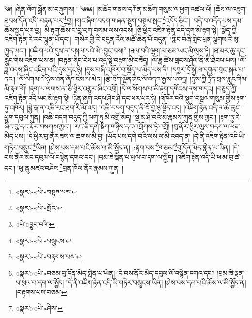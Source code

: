 ༄། །ཞེན་ལོག་སྒྲོན་མ་བཞུགས། ། ༄༅༅། །མཆོད་གནས་དཀོན་མཆོག་གསུམ་ལ་ཕྱག་འཚལ་ལོ། །ཆོས་ལ་འཇུག་ཐབས་དོན་འདི་:བརྟན་པར་\footnote{«སྣར་»«པེ་»བསྟན་པར་}བྱ། །གང་ཞིག་བདག་གཞན་སྡུག་བསྔལ་སྤང་\footnote{«སྣར་»«པེ་»སྤོང་}འདོད་ཅིང་། །བདེ་བ་འདོད་པས་དམ་ཆོས་སྤྱད་པར་བྱ། །མི་རྟག་ཆོས་ལ་བྱེ་བྲག་བསམ་ལས་འདས། །ཅི་ཕྱིར་འཇིག་རྟེན་འདི་དག་མི་རྟག་སྟེ། །སྣོད་ཀྱི་འཇིག་རྟེན་རི་རབ་ལྷུན་པོ་དང་། །གསེར་གྱི་རི་བདུན་རོལ་མཚོ་ཆེན་པོ་བདུན། །གླིང་བཞི་གླིང་ཕྲན་ལྕགས་རི་མུ་ཁྱུད་ཡང་། །འཇིག་པའི་དུས་ན་བསྐལ་པའི་མེ་:བྱུང་བས།\footnote{«པེ་»བྱུང་བའི།} །ཐལ་བའི་ལྷག་མ་ཙམ་ཡང་མི་ལུས་ཏེ། །ཐ་མར་ཆུ་དང་རླུང་གིས་འཇིག་པས་ན། །བརྟན་ཞིང་ངེས་པ་འདྲ་སྟེ་བརྟག་མི་བཟོད། །ལོ་ཟླ་ཚེས་གྲངས་ཤོལ་ནི་མི་ཐེབས་པས། །ལོ་ཟླ་འདས་ཞིང་འཇིག་པའི་དུས་དང་ཉེ། །དུས་བཞི་འཁོར་བ་སྡོད་པ་མེད་པས་ནི། །དབྱར་དྲོ་སྐྱེ་ལ་དགུན་གྲང་སྐམ་པ་དང་། །ལོ་ལེགས་ལོ་ཉེས་ཐན་ཞོད་ངེས་པ་མེད། །རྩི་ཐོག་ལྗོན་ཤིང་ལོ་འདབ་རྒྱས་པ་འདྲ། །དུས་ཀྱི་དྲོད་བྲལ་རླུང་གིས་མི་རྟག་གོ། །རྟག་པ་ལགས་ན་ཅི་ཕྱིར་འགྱུར་ཞིང་འགྲོ། །དེ་ལ་སོགས་པ་མི་རྟག་དགོངས་ནས་གདའ། །བཅུད་ཀྱི་འཇིག་རྟེན་འདི་ཡང་མི་རྟག་སྟེ། །ཉིན་ཞག་འདས་ཤིང་ཤི་དང་ཕར་ཕར་ཉེ། །འཁོར་བའི་སྡུག་བསྔལ་གསུམ་གྱིས་རྟག་ཏུ་འཁོར། །སྐྱེ་རྒ་ན་འཆི་རང་ཐག་རི་མོ་འདྲ། །འཆི་བདག་བདུད་ནི་སོ་བྱ་ཉ་སྡོད་འདྲ། །འཇིག་རྟེན་འདི་ན་ཆེ་ཆུང་ཕྱུག་དབུལ་ཀུན། །འཆི་བདག་བདུད་ཀྱི་ལག་ཏུ་མི་འགྲོ་མེད། །སྔ་མ་ཤི་བའི་མི་རྣམས་ཀུན་གྱིས་ཀྱང་། །རྟག་ཏུ་རེ་ཞིང་བུ་དང་ནོར་བསགས་ཀྱང་། །རང་ནི་དགེ་སྡིག་གཉིས་དང་འགྲོགས་ཏེ་འགྲོ། །བུ་ནོར་ཕྱིར་ལུས་བདག་ལ་ཕན་མེད་པས། །དེ་ཕྱིར་བུ་ནོར་ཟས་ལ་ཆགས་མི་བྱ། །ཡོད་པས་དགེ་བའི་ལས་ལ་མི་འབད་ན། །དེ་ནི་འཇིག་རྟེན་འདི་ཡི་གཏེར་བསྲུང་\footnote{«སྣར་»«པེ་»བསྲུངས་}ཡིན། །ཤེས་པས་དམ་པའི་ཆོས་ལ་མི་སྤྱོད་ན། །:རྟག་པས་\footnote{«སྣར་»«པེ་»བརྟགས་པས་}གཅམ་\footnote{«སྣར་»«པེ་»བཅམ་བུ་དོན་མེད་གླེན་པ་ཡིན། །དེ་བས་ནོར་མེད་དབུལ་ལོ་བསྙེན་དགའ་དང་། །བྲམ་ཟེ་ལྡན་པ་ཕུལ་བ་དག་ལ་སྤྱོད། །དེ་ནི་འཇིག་རྟེན་འདི་ཡི་གཏེར་བསྲུངས་ཡིན། །ཤེས་པས་དམ་པའི་ཆོས་ལ་མི་སྤྱོད་ན། །བརྟགས་པས་བཅམ་}བུ་དོན་མེད་གླེན་པ་ཡིན། །དེ་བས་ནོར་མེད་དབུལ་ལོ་བསྙེན་དགའ་དང་། །བྲམ་ཟེ་ལྡན་པ་ཕུལ་བ་དག་ལ་སྤྱོད། །འཇིག་རྟེན་འདི་ཡི་ཕ་མ་བུ་ཚ་དང་། །ཕུ་ནུ་མཛའ་བཤེས་\footnote{«སྣར་»«པེ་»ཤེས་}བྲན་ཁོལ་ནོར་རྣམས་ཀུན། །
